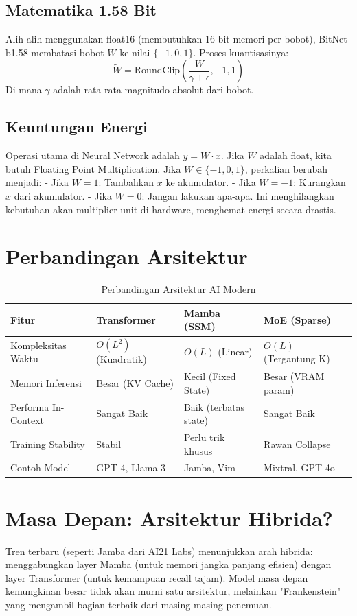 \subsection{Matematika 1.58 Bit}
Alih-alih menggunakan float16 (membutuhkan 16 bit memori per bobot), BitNet b1.58 membatasi bobot $W$ ke nilai $\{-1, 0, 1\}$.
Proses kuantisasinya:
\begin{equation}
\tilde{W} = \text{RoundClip}\left( \frac{W}{\gamma + \epsilon}, -1, 1 \right)
\end{equation}
Di mana $\gamma$ adalah rata-rata magnitudo absolut dari bobot.

\subsection{Keuntungan Energi}
Operasi utama di Neural Network adalah $y = W \cdot x$.
Jika $W$ adalah float, kita butuh Floating Point Multiplication.
Jika $W \in \{-1, 0, 1\}$, perkalian berubah menjadi:
- Jika $W=1$: Tambahkan $x$ ke akumulator.
- Jika $W=-1$: Kurangkan $x$ dari akumulator.
- Jika $W=0$: Jangan lakukan apa-apa.
Ini menghilangkan kebutuhan akan multiplier unit di hardware, menghemat energi secara drastis.

\section{Perbandingan Arsitektur}

\begin{table}[h]
\centering
\begin{tabular}{|l|l|l|l|}
\hline
\textbf{Fitur} & \textbf{Transformer} & \textbf{Mamba (SSM)} & \textbf{MoE (Sparse)} \\ \hline
Kompleksitas Waktu & $O(L^2)$ (Kuadratik) & $O(L)$ (Linear) & $O(L)$ (Tergantung K) \\ \hline
Memori Inferensi & Besar (KV Cache) & Kecil (Fixed State) & Besar (VRAM param) \\ \hline
Performa In-Context & Sangat Baik & Baik (terbatas state) & Sangat Baik \\ \hline
Training Stability & Stabil & Perlu trik khusus & Rawan Collapse \\ \hline
Contoh Model & GPT-4, Llama 3 & Jamba, Vim & Mixtral, GPT-4o \\ \hline
\end{tabular}
\caption{Perbandingan Arsitektur AI Modern}
\end{table}

\section{Masa Depan: Arsitektur Hibrida?}
Tren terbaru (seperti Jamba dari AI21 Labs) menunjukkan arah hibrida: menggabungkan layer Mamba (untuk memori jangka panjang efisien) dengan layer Transformer (untuk kemampuan recall tajam). Model masa depan kemungkinan besar tidak akan murni satu arsitektur, melainkan "Frankenstein" yang mengambil bagian terbaik dari masing-masing penemuan.
